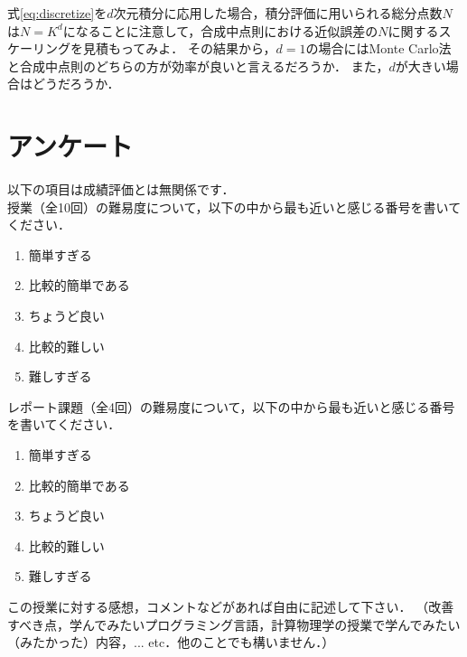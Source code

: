 \documentclass[a4paper,12pt]{jsarticle}
\begin{document}
式\eqref{eq:discretize}を$d$次元積分に応用した場合，積分評価に用いられる総分点数$N$は$N=K^{d}$になることに注意して，合成中点則における近似誤差の$N$に関するスケーリングを見積もってみよ．
その結果から，$d=1$の場合にはMonte Carlo法と合成中点則のどちらの方が効率が良いと言えるだろうか．
また，$d$が大きい場合はどうだろうか．


\section{アンケート}

以下の項目は成績評価とは無関係です．\\

授業（全10回）の難易度について，以下の中から最も近いと感じる番号を書いてください．
\begin{enumerate}
    \item 簡単すぎる 
    \item 比較的簡単である
    \item ちょうど良い
    \item 比較的難しい
    \item 難しすぎる
\end{enumerate}

レポート課題（全4回）の難易度について，以下の中から最も近いと感じる番号を書いてください．
\begin{enumerate}
    \item 簡単すぎる
    \item 比較的簡単である
    \item ちょうど良い
    \item 比較的難しい
    \item 難しすぎる
\end{enumerate}

この授業に対する感想，コメントなどがあれば自由に記述して下さい．
（改善すべき点，学んでみたいプログラミング言語，計算物理学の授業で学んでみたい（みたかった）内容，... etc．他のことでも構いません．）



%
%
\end{document}
